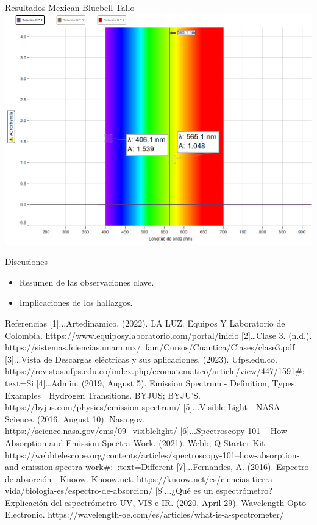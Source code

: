 \documentclass{beamer}
\begin{document}
\begin{frame}{Resultados Mexican Bluebell Tallo}
    \includegraphics[scale=0.3]{mexicanBluebellCoordenadas.png}
\end{frame}

\begin{frame}{Discusiones}
    \begin{itemize}
        \item Resumen de las observaciones clave.
        \item Implicaciones de los hallazgos.
    \end{itemize}
\end{frame}

\begin{frame}{Referencias}
   \small [1]...Artedinamico. (2022). LA LUZ. Equipos Y Laboratorio de Colombia. https://www.equiposylaboratorio.com/portal/inicio
[2]‌…Clase 3. (n.d.). https://sistemas.fciencias.unam.mx/~fam/Cursos/Cuantica/Clases/clase3.pdf
[3]...Vista de Descargas eléctricas y sus aplicaciones. (2023). Ufps.edu.co. https://revistas.ufps.edu.co/index.php/ecomatematico/article/view/447/1591#:~:text=Si%
[4]‌…Admin. (2019, August 5). Emission Spectrum - Definition, Types, Examples | Hydrogen Transitions. BYJUS; BYJU’S. https://byjus.com/physics/emission-spectrum/
‌[5]...Visible Light - NASA Science. (2016, August 10). Nasa.gov. https://science.nasa.gov/ems/09_visiblelight/
[6]...Spectroscopy 101 – How Absorption and Emission Spectra Work. (2021). Webb; Q Starter Kit. https://webbtelescope.org/contents/articles/spectroscopy-101--how-absorption-and-emission-spectra-work#:~:text=Different%
‌[7]...Fernandes, A. (2016). Espectro de absorción - Knoow. Knoow.net. https://knoow.net/es/ciencias-tierra-vida/biologia-es/espectro-de-absorcion/
‌[8]...¿Qué es un espectrómetro? Explicación del espectrómetro UV, VIS e IR. (2020, April 29). Wavelength Opto-Electronic. https://wavelength-oe.com/es/articles/what-is-a-spectrometer/
\end{frame}
\end{document}
